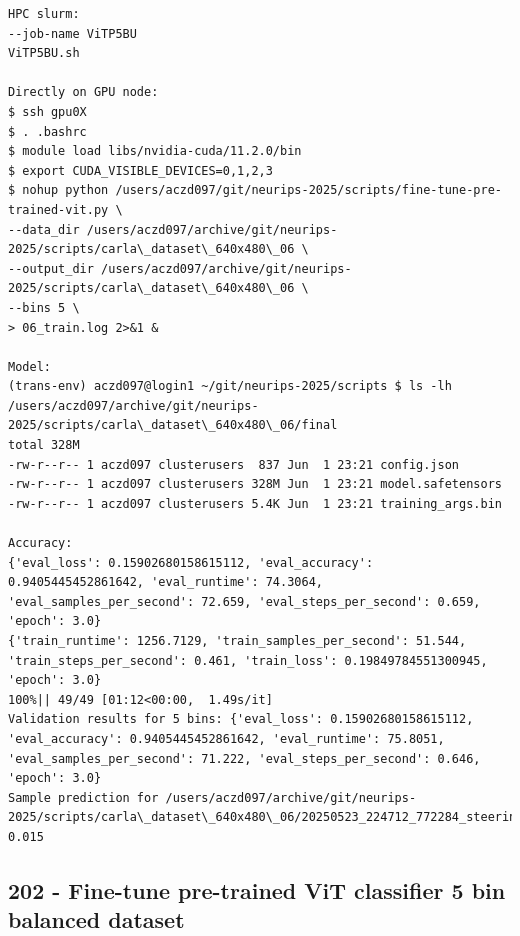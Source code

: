 \begin{verbatim}
HPC slurm:
--job-name ViTP5BU
ViTP5BU.sh

Directly on GPU node:
$ ssh gpu0X
$ . .bashrc
$ module load libs/nvidia-cuda/11.2.0/bin
$ export CUDA_VISIBLE_DEVICES=0,1,2,3
$ nohup python /users/aczd097/git/neurips-2025/scripts/fine-tune-pre-trained-vit.py \
--data_dir /users/aczd097/archive/git/neurips-2025/scripts/carla\_dataset\_640x480\_06 \
--output_dir /users/aczd097/archive/git/neurips-2025/scripts/carla\_dataset\_640x480\_06 \
--bins 5 \
> 06_train.log 2>&1 &

Model:
(trans-env) aczd097@login1 ~/git/neurips-2025/scripts $ ls -lh /users/aczd097/archive/git/neurips-2025/scripts/carla\_dataset\_640x480\_06/final
total 328M
-rw-r--r-- 1 aczd097 clusterusers  837 Jun  1 23:21 config.json
-rw-r--r-- 1 aczd097 clusterusers 328M Jun  1 23:21 model.safetensors
-rw-r--r-- 1 aczd097 clusterusers 5.4K Jun  1 23:21 training_args.bin

Accuracy:
{'eval_loss': 0.15902680158615112, 'eval_accuracy': 0.9405445452861642, 'eval_runtime': 74.3064, 'eval_samples_per_second': 72.659, 'eval_steps_per_second': 0.659, 'epoch': 3.0}
{'train_runtime': 1256.7129, 'train_samples_per_second': 51.544, 'train_steps_per_second': 0.461, 'train_loss': 0.19849784551300945, 'epoch': 3.0}
100%|| 49/49 [01:12<00:00,  1.49s/it]
Validation results for 5 bins: {'eval_loss': 0.15902680158615112, 'eval_accuracy': 0.9405445452861642, 'eval_runtime': 75.8051, 'eval_samples_per_second': 71.222, 'eval_steps_per_second': 0.646, 'epoch': 3.0}
Sample prediction for /users/aczd097/archive/git/neurips-2025/scripts/carla\_dataset\_640x480\_06/20250523_224712_772284_steering_0.0150.jpg: 0.015

\end{verbatim}

\subsection{202 - Fine-tune pre-trained ViT classifier 5 bin balanced dataset}
\label{app_res:202}

